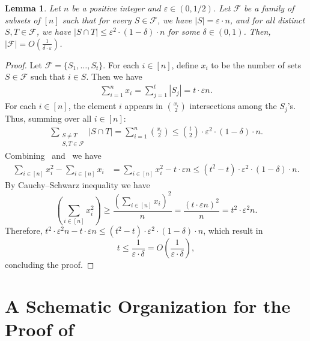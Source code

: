 \documentclass[11pt]{article}
\newtheorem*{lemma*}{Lemma}
\theoremstyle{definition}
\renewcommand{\leq}{\leqslant}
\renewcommand{\geq}{\geqslant}
\newcommand{\card}[1]{\left\vert{#1}\right\vert}
\begin{document}
\begin{lemma*}
Let $n$ be a positive integer and $\varepsilon \in (0, 1/2)$. Let $\mathcal{F}$ be a family of subsets of $[n]$ such that for every $S \in \mathcal{F}$, we have $\card{S} = \varepsilon \cdot n$, and for all distinct $S, T \in \mathcal{F}$, we have 
$\left|S \cap T \right| \leq \varepsilon^2 \cdot (1-\delta)\cdot n$ for some $\delta\in (0, 1)$.
Then, $\left|\mathcal{F}\right| = O(\frac{1}{\delta\cdot \varepsilon})$.
\end{lemma*}
\begin{proof}
    Let $\mathcal{F}=\{S_1, \ldots, S_t\}$.
    For each $i\in [n]$, define $x_i$ to be the number of sets $S\in \mathcal{F}$ such that $i\in S$. Then we have
    \begin{align}
    \sum_{i=1}^n x_i = \sum_{j=1}^t |S_j| = t \cdot \varepsilon n. \label{eq:sum-xi}
    \end{align}
    For each $i \in [n]$, the element $i$ appears in ${x_i \choose 2}$ intersections among the $S_j$'s. Thus, summing over all $i \in [n]$:
    \begin{align}
    \sum_{\substack{S \neq T \\ S,T \in \mathcal{F}}} |S \cap T| = \sum_{i=1}^n {x_i \choose 2} \leq {t \choose 2} \cdot \varepsilon^2 \cdot (1-\delta) \cdot n. \label{eq:sum-intersections}
    \end{align}
    Combining~ and~ we have
    \begin{align*}
        \sum_{i\in [n]} x_i^2- \sum_{i\in [n]}x_i
        &=\sum_{i\in [n]} x_i^2 - t\cdot \varepsilon n \leq (t^2-t)\cdot \varepsilon^2 \cdot (1-\delta)\cdot n.
    \end{align*}
    By Cauchy–Schwarz inequality we have 
    \[
    (\sum_{i\in [n]} x_i^2) \geq \frac{(\sum_{i\in [n]} x_i)^2}{n}=\frac{(t\cdot \varepsilon n)^2}{n} = t^2\cdot\varepsilon^2 n .
    \]
    Therefore, 
    $
    t^2\cdot \varepsilon^2 n - t \cdot \varepsilon n \leq (t^2-t)\cdot \varepsilon^2 \cdot (1-\delta)\cdot n
    $,
    which result in 
    \[
    t \leq \frac{1}{\varepsilon\cdot \delta} = O(\frac{1}{\varepsilon\cdot \delta}),
    \]
    concluding the proof.
\end{proof}


\clearpage

\section{A Schematic Organization for the Proof of }\label{sec:schema-org}
\end{document}
